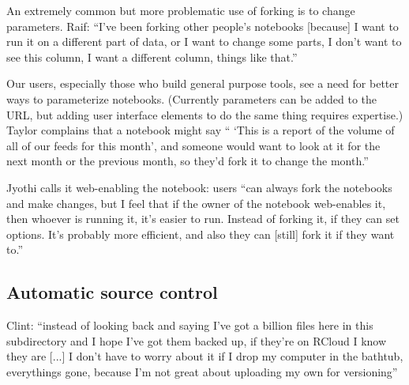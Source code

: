 

An extremely common but more problematic use of forking is to
change parameters. Raif: ``I've been forking other people's notebooks [because]
I want to run it on a different part of data, or I want to change some parts, I
don't want to see this column, I want a different column, things like that.''

Our users, especially those who build general purpose tools, see a need for better ways
to parameterize notebooks.  (Currently parameters can be added to the URL, but adding
user interface elements to do the same thing requires expertise.) Taylor complains that
a notebook might say `` `This is a report of the volume of all of
our feeds for this month', and someone would want to look at it for the next
month or the previous month, so they'd fork it to change the month.''

Jyothi calls it web-enabling the notebook: users ``can always fork the
notebooks and make changes, but I feel that if the owner of the notebook
web-enables it, then whoever is running it, it's easier to run. Instead of
forking it, if they can set options. It's probably more efficient, and also they
can [still] fork it if they want to.''


\subsection{Automatic source control}

Clint: ``instead of looking back and saying I've got a billion files here in
this subdirectory and I hope I've got them backed up, if they're on RCloud I
know they are [...] I don't have to worry about it if I drop my computer in the
bathtub, everythings gone, because I'm not great about uploading my own for
versioning''

